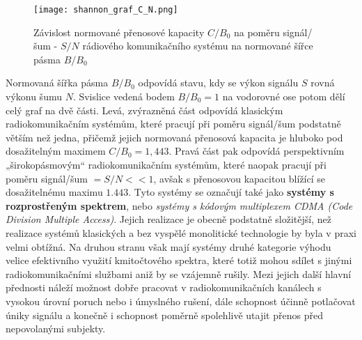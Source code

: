       \begin{figure}[ht!]  %
        \centering
        \texttt{[image: shannon\_graf\_C\_N.png]}
        \caption{Závislost normované přenosové kapacity \(C/B_0\) na poměru signál/šum - \(S/N\) rádiového 
                 komunikačního systému na normované šířce pásma \(B/B_0\)}
        \label{fig_RA:modulace02}
      \end{figure} 
      
      Normovaná šířka pásma \(B/B_0\) odpovídá stavu, kdy se výkon signálu \(S\) rovná výkonu šumu \(N\). 
      Svislice vedená bodem \(B/B_0 = 1\) na vodorovné ose potom dělí celý graf na dvě části. Levá, 
      zvýrazněná část odpovídá klasickým radiokomunikačním systémům, které pracují při poměru signál/šum 
      podstatně větším než jedna, přičemž jejich normovaná přenosová kapacita je hluboko pod dosažitelným 
      maximem \(C/B_0 = 1,443\). Pravá část pak odpovídá perspektivním „širokopásmovým“ 
      radiokomunikačním systémům, které naopak pracují při poměru signál/šum \(= S/N<<1\), avšak s přenosovou 
      kapacitou blížící se dosažitelnému maximu \(\num{1.443}\). Tyto systémy se označují také jako 
      \textbf{systémy s rozprostřeným spektrem}, nebo \emph{systémy s kódovým multiplexem CDMA (Code Division 
      Multiple Access)}. Jejich realizace je obecně podstatně složitější, než realizace systémů klasických a 
      bez vyspělé monolitické technologie by byla v praxi velmi obtížná. Na druhou stranu však mají systémy 
      druhé kategorie výhodu velice efektivního využití kmitočtového spektra, které totiž mohou sdílet s 
      jinými radiokomunikačními službami aniž by se vzájemně rušily. Mezi jejich další hlavní přednosti 
      náleží možnost dobře pracovat v radiokomunikačních kanálech s vysokou úrovní poruch nebo i úmyslného 
      rušení, dále schopnost účinně potlačovat úniky signálu a konečně i schopnost poměrně spolehlivě utajit 
      přenos před nepovolanými subjekty.\cite[s.~78]{ZaludRA}
      

